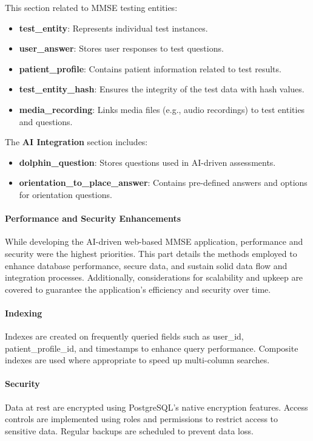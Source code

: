 This section related to MMSE testing entities:
\begin{itemize}
    \item \textbf{test\_entity}: Represents individual test instances.
    \item \textbf{user\_answer}: Stores user responses to test questions.
    \item \textbf{patient\_profile}: Contains patient information related to test results.
    \item \textbf{test\_entity\_hash}: Ensures the integrity of the test data with hash values.
    \item \textbf{media\_recording}: Links media files (e.g., audio recordings) to test entities and questions.
\end{itemize}

The \textbf{AI Integration} section includes:
\begin{itemize}
    \item \textbf{dolphin\_question}: Stores questions used in AI-driven assessments.
    \item \textbf{orientation\_to\_place\_answer}: Contains pre-defined answers and options for orientation questions.
\end{itemize}

\paragraph{Performance and Security Enhancements}
While developing the AI-driven web-based MMSE application, performance and security were the highest priorities. This part details the methods employed to enhance database performance, secure data, and sustain solid data flow and integration processes. Additionally, considerations for scalability and upkeep are covered to guarantee the application's efficiency and security over time.

\paragraph{Indexing}
Indexes are created on frequently queried fields such as user\_id, patient\_profile\_id, and timestamps to enhance query performance. Composite indexes are used where appropriate to speed up multi-column searches.

\paragraph{Security}
Data at rest are encrypted using PostgreSQL's native encryption features. Access controls are implemented using roles and permissions to restrict access to sensitive data. Regular backups are scheduled to prevent data loss.

